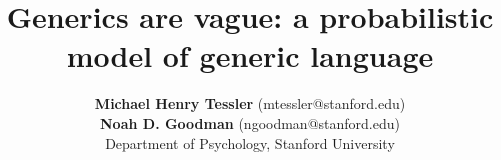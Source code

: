 \documentclass[10pt,letterpaper]{article}
\title{Generics are vague: a probabilistic model of generic language}
\author{{\large \bf Michael Henry Tessler} (mtessler@stanford.edu)\\ {\large \bf Noah D. Goodman} (ngoodman@stanford.edu) \\
  Department of Psychology, Stanford University}
\newcommand{\ndg}[1]{\textcolor{Green}{[ndg: #1]}}
\newcommand{\mht}[1]{\textcolor{Blue}{[mht: #1]}}
\begin{document}
\maketitle


\begin{abstract}

%

\end{abstract}
\end{document}
